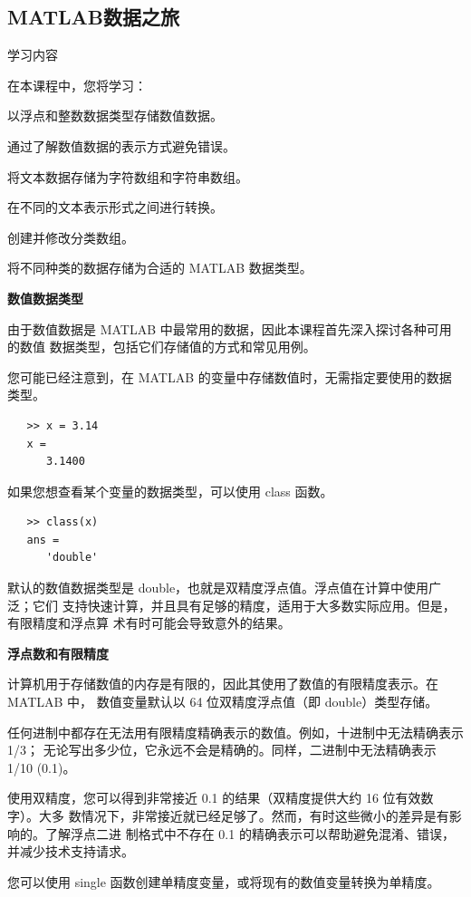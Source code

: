 \documentclass[12pt,a4paper]{article}
\begin{document}
\subsection{MATLAB数据之旅}

学习内容

在本课程中，您将学习：

以浮点和整数数据类型存储数值数据。

通过了解数值数据的表示方式避免错误。

将文本数据存储为字符数组和字符串数组。

在不同的文本表示形式之间进行转换。

创建并修改分类数组。

将不同种类的数据存储为合适的 MATLAB 数据类型。

\textbf{数值数据类型}

由于数值数据是 MATLAB 中最常用的数据，因此本课程首先深入探讨各种可用的数值
数据类型，包括它们存储值的方式和常见用例。

您可能已经注意到，在 MATLAB 的变量中存储数值时，无需指定要使用的数据类型。

\begin{lstlisting}
   >> x = 3.14
   x =
      3.1400
\end{lstlisting}

如果您想查看某个变量的数据类型，可以使用 class 函数。

\begin{lstlisting}
   >> class(x)
   ans =
      'double'
\end{lstlisting}

默认的数值数据类型是 double，也就是双精度浮点值。浮点值在计算中使用广泛；它们
支持快速计算，并且具有足够的精度，适用于大多数实际应用。但是，有限精度和浮点算
术有时可能会导致意外的结果。

\textbf{浮点数和有限精度}

计算机用于存储数值的内存是有限的，因此其使用了数值的有限精度表示。在 MATLAB 中，
数值变量默认以 64 位双精度浮点值（即 double）类型存储。

任何进制中都存在无法用有限精度精确表示的数值。例如，十进制中无法精确表示 1/3；
无论写出多少位，它永远不会是精确的。同样，二进制中无法精确表示 1/10 (0.1)。

使用双精度，您可以得到非常接近 0.1 的结果（双精度提供大约 16 位有效数字）。大多
数情况下，非常接近就已经足够了。然而，有时这些微小的差异是有影响的。了解浮点二进
制格式中不存在 0.1 的精确表示可以帮助避免混淆、错误，并减少技术支持请求。

您可以使用 single 函数创建单精度变量，或将现有的数值变量转换为单精度。
\end{document}
